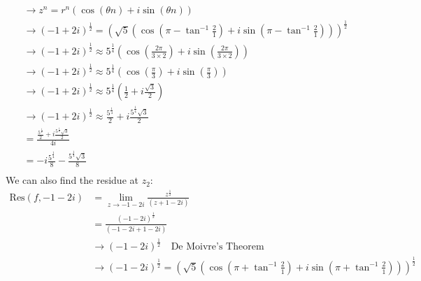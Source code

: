 \begin{example}
\begin{align*}
                             & \rightarrow z^n = r^n(\cos(\theta n) + i\sin(\theta n))                                                                            \\
                             & \rightarrow (-1+2i)^{\frac{1}{2}} = (\sqrt{5}(\cos(\pi - \tan^{-1}{\frac{2}1}) + i\sin(\pi - \tan^{-1}{\frac{2}1})))^{\frac{1}{2}} \\
                             & \rightarrow (-1+2i)^{\frac{1}{2}} \approx 5^\frac{1}{4}(\cos(\frac{2\pi}{3\times 2}) + i\sin(\frac{2\pi}{3\times 2}))              \\
                             & \rightarrow (-1+2i)^{\frac{1}{2}} \approx 5^\frac{1}{4}(\cos(\frac{\pi}{3}) + i\sin(\frac{\pi}{3}))                                \\
                             & \rightarrow (-1+2i)^{\frac{1}{2}} \approx 5^\frac{1}{4}(\frac{1}{2} + i\frac{\sqrt{3}}{2})                                         \\
                             & \rightarrow (-1+2i)^{\frac{1}{2}} \approx \frac{5^\frac{1}{4}}{2} + i\frac{5^\frac{1}{4}\sqrt{3}}{2}                               \\
                             & = \frac{\frac{5^\frac{1}{4}}{2} + i\frac{5^\frac{1}{4}\sqrt{3}}{2}}{4i}                                                            \\
                             & = -i\frac{5^\frac{1}{4}}8 - \frac{5^\frac{1}{4}\sqrt{3}}{8}                                                                        \\
    \end{align*}
    We can also find the residue at $z_2$:
    \begin{align*}
        \text{Res}(f, -1-2i) & = \lim_{z \to -1-2i} \frac{z^\frac{1}{2}}{(z + 1 - 2i)}                                                                            \\
                             & = \frac{(-1-2i)^{\frac{1}{2}}}{(-1-2i + 1 - 2i)}                                                                                   \\
                             & \rightarrow (-1-2i)^{\frac{1}{2}} \quad \text{De Moivre's Theorem}                                                                 \\
                             & \rightarrow (-1-2i)^{\frac{1}{2}} = (\sqrt{5}(\cos(\pi + \tan^{-1}{\frac{2}1}) + i\sin(\pi + \tan^{-1}{\frac{2}1})))^{\frac{1}{2}} \\

\end{align*}
\end{example}
